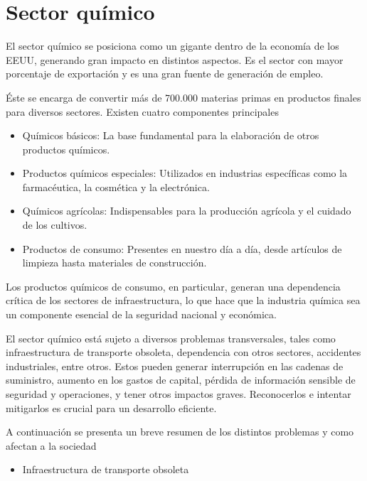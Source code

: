 \documentclass{article}
\providecommand{\tightlist}{%
  \setlength{\itemsep}{0pt}\setlength{\parskip}{0pt}}
\begin{document}
\hypertarget{sector-quuxedmico}{%
\section{Sector químico}\label{sector-quuxedmico}}

El sector químico se posiciona como un gigante dentro de la economía de
los EEUU, generando gran impacto en distintos aspectos. Es el sector con
mayor porcentaje de exportación y es una gran fuente de generación de
empleo.

Éste se encarga de convertir más de 700.000 materias primas en productos
finales para diversos sectores. Existen cuatro componentes principales

\begin{itemize}
\item
  Químicos básicos: La base fundamental para la elaboración de otros
  productos químicos.
\item
  Productos químicos especiales: Utilizados en industrias específicas
  como la farmacéutica, la cosmética y la electrónica.
\item
  Químicos agrícolas: Indispensables para la producción agrícola y el
  cuidado de los cultivos.
\item
  Productos de consumo: Presentes en nuestro día a día, desde artículos
  de limpieza hasta materiales de construcción.
\end{itemize}

Los productos químicos de consumo, en particular, generan una
dependencia crítica de los sectores de infraestructura, lo que hace que
la industria química sea un componente esencial de la seguridad nacional
y económica.

El sector químico está sujeto a diversos problemas transversales, tales
como infraestructura de transporte obsoleta, dependencia con otros
sectores, accidentes industriales, entre otros. Estos pueden generar
interrupción en las cadenas de suministro, aumento en los gastos de
capital, pérdida de información sensible de seguridad y operaciones, y
tener otros impactos graves. Reconocerlos e intentar mitigarlos es
crucial para un desarrollo eficiente.

A continuación se presenta un breve resumen de los distintos problemas y
como afectan a la sociedad

\begin{itemize}
\tightlist
\item
  Infraestructura de transporte obsoleta
\end{itemize}
\end{document}
